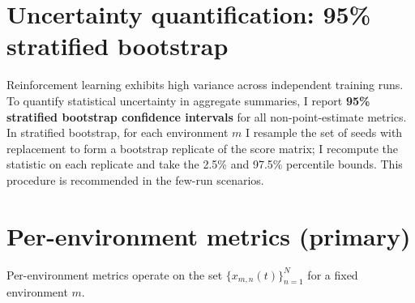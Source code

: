 \section{Uncertainty quantification: 95\% stratified bootstrap}

Reinforcement learning exhibits high variance across independent training runs. To quantify
statistical uncertainty in aggregate summaries, I report \textbf{95\% stratified bootstrap
confidence intervals} for all non-point-estimate metrics. In stratified bootstrap, for each
environment $m$ I resample the set of seeds with replacement to form a bootstrap replicate
of the score matrix; I recompute the statistic on each replicate and take the 2.5\% and
97.5\% percentile bounds. This procedure is recommended in the few-run scenarios. \cite{agarwal2021precipice}

\section{Per-environment metrics (primary)}

Per-environment metrics operate on the set $\{x_{m,n}(t)\}_{n=1}^N$ for a fixed environment $m$.

